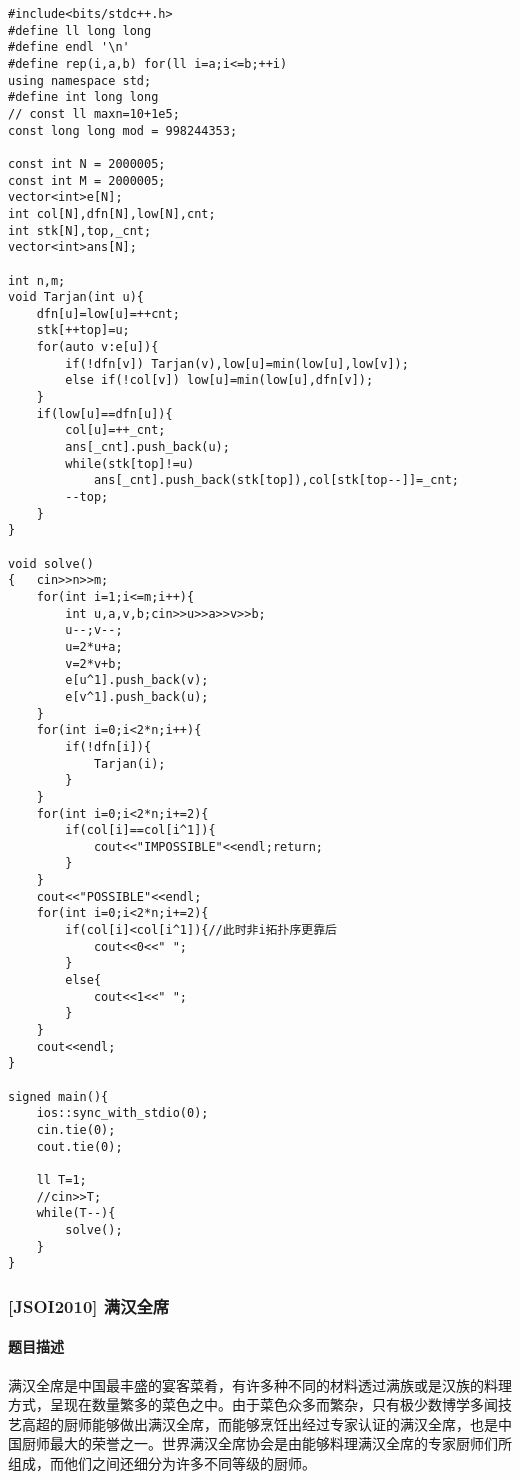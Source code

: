 \documentclass[]{article}
\let\oldparagraph\paragraph
\renewcommand{\paragraph}[1]{\oldparagraph{#1}\mbox{}}
\begin{document}
\begin{verbatim}
#include<bits/stdc++.h>
#define ll long long
#define endl '\n'
#define rep(i,a,b) for(ll i=a;i<=b;++i)
using namespace std;
#define int long long
// const ll maxn=10+1e5;
const long long mod = 998244353;

const int N = 2000005;
const int M = 2000005;
vector<int>e[N];
int col[N],dfn[N],low[N],cnt;
int stk[N],top,_cnt;
vector<int>ans[N];

int n,m;
void Tarjan(int u){
    dfn[u]=low[u]=++cnt;
    stk[++top]=u;
    for(auto v:e[u]){
        if(!dfn[v]) Tarjan(v),low[u]=min(low[u],low[v]);
        else if(!col[v]) low[u]=min(low[u],dfn[v]);
    }
    if(low[u]==dfn[u]){
        col[u]=++_cnt;
        ans[_cnt].push_back(u);
        while(stk[top]!=u)  
            ans[_cnt].push_back(stk[top]),col[stk[top--]]=_cnt;
        --top;
    }
}

void solve()
{   cin>>n>>m;
    for(int i=1;i<=m;i++){
        int u,a,v,b;cin>>u>>a>>v>>b;
        u--;v--;
        u=2*u+a;
        v=2*v+b;
        e[u^1].push_back(v);
        e[v^1].push_back(u);
    }
    for(int i=0;i<2*n;i++){
        if(!dfn[i]){
            Tarjan(i);
        }
    }
    for(int i=0;i<2*n;i+=2){
        if(col[i]==col[i^1]){
            cout<<"IMPOSSIBLE"<<endl;return;
        }
    }
    cout<<"POSSIBLE"<<endl;
    for(int i=0;i<2*n;i+=2){
        if(col[i]<col[i^1]){//此时非i拓扑序更靠后
            cout<<0<<" ";
        }
        else{
            cout<<1<<" ";
        }
    }
    cout<<endl;
}

signed main(){
    ios::sync_with_stdio(0);
    cin.tie(0);
    cout.tie(0);

    ll T=1; 
    //cin>>T;
    while(T--){
        solve();
    }
}
\end{verbatim}

\hypertarget{jsoi2010-ux6ee1ux6c49ux5168ux5e2d}{%
\subsubsection{{[}JSOI2010{]}
满汉全席}\label{jsoi2010-ux6ee1ux6c49ux5168ux5e2d}}

\hypertarget{ux9898ux76eeux63cfux8ff0-1}{%
\paragraph{题目描述}\label{ux9898ux76eeux63cfux8ff0-1}}

满汉全席是中国最丰盛的宴客菜肴，有许多种不同的材料透过满族或是汉族的料理方式，呈现在数量繁多的菜色之中。由于菜色众多而繁杂，只有极少数博学多闻技艺高超的厨师能够做出满汉全席，而能够烹饪出经过专家认证的满汉全席，也是中国厨师最大的荣誉之一。世界满汉全席协会是由能够料理满汉全席的专家厨师们所组成，而他们之间还细分为许多不同等级的厨师。
\end{document}
